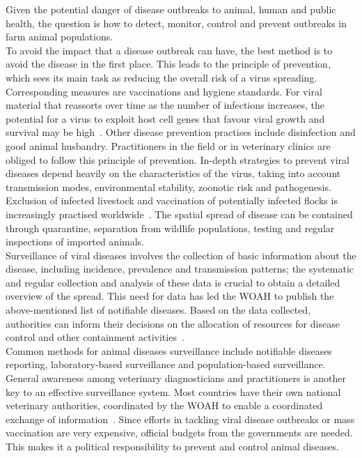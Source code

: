 Given the potential danger of disease outbreaks to animal, human and public health, the question is how to detect, monitor, control and prevent outbreaks in farm animal populations. \\
To avoid the impact that a disease outbreak can have, the best method is to avoid the disease in the first place. This leads to the principle of prevention, which sees its main task as reducing the overall risk of a virus spreading. Corresponding measures are vaccinations and hygiene standards. For viral material that reassorts over time as the number of infections increases, the potential for a virus to exploit host cell genes that favour viral growth and survival may be high~\cite{fenner2017maclachlan}. Other disease prevention practises include disinfection and good animal husbandry. Practitioners in the field or in veterinary clinics are obliged to follow this principle of prevention. In-depth strategies to prevent viral diseases depend heavily on the characteristics of the virus, taking into account transmission modes, environmental stability, zoonotic risk and pathogenesis. Exclusion of infected livestock and vaccination of potentially infected flocks is increasingly practised worldwide~\cite{fenner2017maclachlan}. The spatial spread of disease can be contained through quarantine, separation from wildlife populations, testing and regular inspections of imported animals. \\
Surveillance of viral diseases involves the collection of basic information about the disease, including incidence, prevalence and transmission patterns; the systematic and regular collection and analysis of these data is crucial to obtain a detailed overview of the spread. This need for data has led the WOAH to publish the above-mentioned list of notifiable diseases. Based on the data collected, authorities can inform their decisions on the allocation of resources for disease control and other containment activities~\cite{fenner2017maclachlan, who2017one}. \\
Common methods for animal diseases surveillance include notifiable diseases reporting, laboratory-based surveillance and population-based surveillance. General awareness among veterinary diagnosticians and practitioners is another key to an effective surveillance system. Most countries have their own national veterinary authorities, coordinated by the WOAH to enable a coordinated exchange of information~\cite{who2017one}. Since efforts in tackling viral disease outbreaks or mass vaccination are very expensive, official budgets from the governments are needed. This makes it a political responsibility to prevent and control animal diseases.

